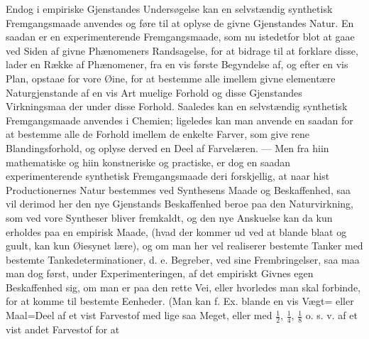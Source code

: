 \documentclass[12pt]{book}
\makeatletter
\def\textit#1{#1}%
\def\emph#1{#1}%
\newcommand{\umph}[2][misc]{%
  \@ifundefined{umph@#1@on}{#2}{\emph{#2}}}
\newcommand{\opage}[1]{\marginnote{\footnotesize\textit{[#1]}}}
\makeatother
\begin{document}
Endog i empiriske Gjenstandes Undersøgelse kan en selvstændig synthetisk
Fremgangsmaade anvendes og føre til at oplyse de givne Gjenstandes Natur. En saadan er
en experimenterende Fremgangsmaade, som nu istedetfor blot at gaae ved Siden af givne
Phænomeners Randsagelse, for at bidrage til at forklare disse, lader en Række af
Phænomener, fra en vis første Begyndelse af, og efter en vis Plan, opstaae for vore
Øine, for at bestemme alle imellem givne elementære Naturgjenstande af en vis Art
muelige Forhold og disse Gjenstandes Virkningsmaa%
\opage{156}der under disse Forhold. Saaledes kan en selvstændig synthetisk Fremgangsmaade
anvendes i Chemien; ligeledes kan man anvende en saadan for at bestemme alle de Forhold
imellem de enkelte Farver, som give rene Blandingsforhold, og oplyse derved en Deel af
Farvelæren. --- Men fra hiin mathematiske og hiin konstneriske og practiske, er dog en
saadan experimenterende synthetisk Fremgangsmaade deri forskjellig, at naar hist
Productionernes Natur bestemmes ved Synthesens Maade og Beskaffenhed, saa vil derimod
her den nye Gjenstands Beskaffenhed beroe paa den Naturvirkning, som ved vore Syntheser
bliver fremkaldt, og den nye Anskuelse kan da kun erholdes paa en empirisk Maade, (hvad
der kommer ud ved at blande blaat og guult, kan kun Øiesynet lære), og om man her vel
realiserer bestemte Tanker med bestemte Tankedeterminationer, d. e. Begreber, ved sine
Frembringelser, saa maa man dog først, under Experimenteringen, af det empiriskt Givnes
egen Beskaffenhed \umph[schwab]{abstrahere} sig, om man er paa den rette Vei, eller
hvorledes man skal forbinde, for at komme til bestemte Eenheder. (Man kan f. Ex. blande
en vis Vægt= eller Maal=Deel af et vist Farvestof med lige saa Meget, eller med
$\frac{1}{2}$, $\frac{1}{4}$, $\frac{1}{8}$ o. s. v. af et vist andet Farvestof for at
\end{document}
